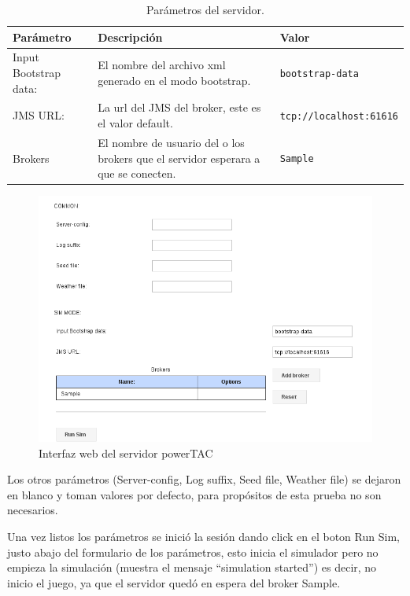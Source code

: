 \begin{table}[!h]
	\begin{center}
		\begin{tabular}{|p{2.5cm}|p{7cm}|p{4cm}|}\hline
			\textbf{Parámetro} & \textbf{Descripción} & \textbf{Valor} \\ \hline
				Input Bootstrap data:  &El nombre del archivo xml generado en el modo bootstrap. & \texttt{bootstrap-data} \\ \hline
				JMS URL: & La url del JMS del broker, este es el valor default. & \texttt{tcp://localhost:61616} \\\hline
				Brokers  & El nombre de usuario del o los brokers que el servidor esperara a que se conecten. & \texttt{Sample}
			\\ \hline
		\end{tabular}			
	\end{center}
	\caption{ Parámetros del servidor.}
	\label{tab:parametros}
\end{table}


\begin{figure}[!h]
	\centering
	\includegraphics[width=13cm]{img/interfazFormularioWeb.png}
	\caption{Interfaz web del servidor powerTAC}
	\label{fig:interfazFormularioWeb}
\end{figure}

Los otros parámetros (Server-config, Log suffix, Seed file, Weather file) se dejaron en blanco y toman valores por defecto, para propósitos de esta prueba no son necesarios.

Una vez listos los parámetros se inició la sesión dando click en el boton Run Sim, justo abajo del formulario de los parámetros, esto inicia el simulador pero no empieza la simulación %
(muestra el mensaje ``simulation started'') 
es decir, no inicio el juego, ya que el servidor quedó en espera del broker Sample.

